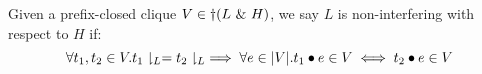 \documentclass[acmsmall,screen,review, nonacm]{acmart}
\begin{document}
\begin{definition}
  Given a prefix-closed clique $V \in \dagger(L ~\&~ H)$, we say $L$ is non-interfering with respect to $H$ if:
  \[
  \forall t_1, t_2 \in V. t_1 \downharpoonright_L = t_2 \downharpoonright_L \implies \forall e \in |V|. t_1 \bullet e \in V \iff t_2 \bullet e \in V
  \]
\end{definition}







\end{document}

